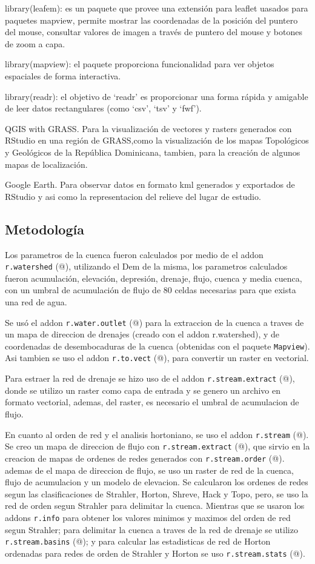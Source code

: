 \documentclass[11pt,]{article}
\begin{document}
library(leafem): es un paquete que provee una extensión para leaflet
uasados para paquetes mapview, permite mostrar las coordenadas de la
posición del puntero del mouse, consultar valores de imagen a través de
puntero del mouse y botones de zoom a capa.

library(mapview): el paquete proporciona funcionalidad para ver objetos
espaciales de forma interactiva.

library(readr): el objetivo de `readr' es proporcionar una forma rápida
y amigable de leer datos rectangulares (como `csv', `tsv' y `fwf').

QGIS with GRASS. Para la visualización de vectores y rasters generados
con RStudio en una región de GRASS,como la visualización de los mapas
Topológicos y Geológicos de la República Dominicana, tambien, para la
creación de algunos mapas de localización.

Google Earth. Para observar datos en formato kml generados y exportados
de RStudio y asi como la representacion del relieve del lugar de
estudio.

\subsection{Metodología}\label{metodologuxeda}

Los parametros de la cuenca fueron calculados por medio de el addon
\texttt{r.watershed} (@), utilizando el Dem de la misma, los parametros
calculados fueron acumulación, elevación, depresión, drenaje, flujo,
cuenca y media cuenca, con un umbral de acumulación de flujo de 80
celdas necesarias para que exista una red de agua.

Se usó el addon \texttt{r.water.outlet} (@) para la extraccion de la
cuenca a traves de un mapa de direccion de drenajes (creado con el addon
r.watershed), y de coordenadas de desembocaduras de la cuenca (obtenidas
con el paquete \texttt{Mapview}). Asi tambien se uso el addon
\texttt{r.to.vect} (@), para convertir un raster en vectorial.

Para estraer la red de drenaje se hizo uso de el addon
\texttt{r.stream.extract} (@), donde se utilizo un raster como capa de
entrada y se genero un archivo en formato vectorial, ademas, del raster,
es necesario el umbral de acumulacion de flujo.

En cuanto al orden de red y el analisis hortoniano, se uso el addon
\texttt{r.stream} (@). Se creo un mapa de direccion de flujo con
\texttt{r.stream.extract} (@), que sirvio en la creacion de mapas de
ordenes de redes generados con \texttt{r.stream.order} (@). ademas de el
mapa de direccion de flujo, se uso un raster de red de la cuenca, flujo
de acumulacion y un modelo de elevacion. Se calcularon los ordenes de
redes segun las clasificaciones de Strahler, Horton, Shreve, Hack y
Topo, pero, se uso la red de orden segun Strahler para delimitar la
cuenca. Mientras que se usaron los addons \texttt{r.info} para obtener
los valores minimos y maximos del orden de red segun Strahler; para
delimitar la cuenca a traves de la red de drenaje se utilizo
\texttt{r.stream.basins} (@); y para calcular las estadisticas de red de
Horton ordenadas para redes de orden de Strahler y Horton se uso
\texttt{r.stream.stats} (@).
\end{document}
